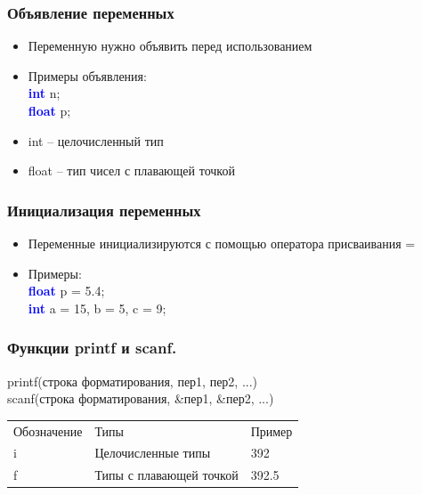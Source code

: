 \documentclass[12pt,pdf,hyperref={unicode}]{beamer}
\begin{document}
\begin{frame}
\frametitle{Объявление переменных} 
\begin{center}
\begin{itemize}
\item Переменную нужно объявить перед использованием
\item Примеры объявления:\\
\textcolor{blue}{\textbf{int}} n;\\
\textcolor{blue}{\textbf{float}} p;
\item int -- целочисленный тип \\
\item float -- тип чисел с плавающей точкой
\end{itemize}
\end{center}
\end{frame}

\begin{frame}
\frametitle{Инициализация переменных} 
\begin{center}
\begin{itemize}
\item Переменные инициализируются с помощью оператора присваивания =
\item Примеры:\\
\textcolor{blue}{\textbf{float}} p = 5.4; \\
\textcolor{blue}{\textbf{int}} a = 15, b = 5, c = 9;
\end{itemize}
\end{center}
\end{frame}



\begin{frame}
\frametitle{Функции printf и scanf.}
printf(строка форматирования, пер1, пер2, ...) \\
scanf(строка форматирования, \&пер1, \&пер2, ...)
\begin{center}
\begin{tabular}{ l l l }
  Обозначение & Типы & Пример \\
  i & Целочисленные типы & 392 \\
  f & Типы с плавающей точкой & 392.5 \\
\end{tabular}
\end{center}

\end{frame}
\end{document}
